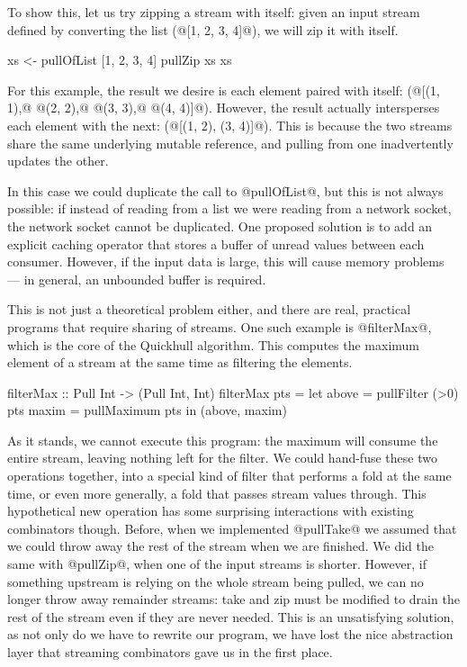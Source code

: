 To show this, let us try zipping a stream with itself: given an input stream defined by converting the list (@[1, 2, 3, 4]@), we will zip it with itself.

\begin{code}
xs <- pullOfList [1, 2, 3, 4]
pullZip xs xs
\end{code}

For this example, the result we desire is each element paired with itself: (@[(1, 1),@ @(2, 2),@ @(3, 3),@ @(4, 4)]@).
However, the result actually intersperses each element with the next: (@[(1, 2), (3, 4)]@).
This is because the two streams share the same underlying mutable reference, and pulling from one inadvertently updates the other.

In this case we could duplicate the call to @pullOfList@, but this is not always possible: if instead of reading from a list we were reading from a network socket, the network socket cannot be duplicated.
One proposed solution is to add an explicit caching operator that stores a buffer of unread values between each consumer. However, if the input data is large, this will cause memory problems --- in general, an unbounded buffer is required. 

This is not just a theoretical problem either, and there are real, practical programs that require sharing of streams.
One such example is @filterMax@, which is the core of the Quickhull algorithm.
This computes the maximum element of a stream at the same time as filtering the elements.

\begin{code}
filterMax :: Pull Int -> (Pull Int, Int)
filterMax pts
 = let above = pullFilter (>0) pts
       maxim = pullMaximum     pts
   in (above, maxim)
\end{code}

As it stands, we cannot execute this program: the maximum will consume the entire stream, leaving nothing left for the filter.
We could hand-fuse these two operations together, into a special kind of filter that performs a fold at the same time, or even more generally, a fold that passes stream values through.
This hypothetical new operation has some surprising interactions with existing combinators though.
Before, when we implemented @pullTake@ we assumed that we could throw away the rest of the stream when we are finished. We did the same with @pullZip@, when one of the input streams is shorter.
However, if something upstream is relying on the whole stream being pulled, we can no longer throw away remainder streams: take and zip must be modified to drain the rest of the stream even if they are never needed.
This is an unsatisfying solution, as not only do we have to rewrite our program, we have lost the nice abstraction layer that streaming combinators gave us in the first place.


